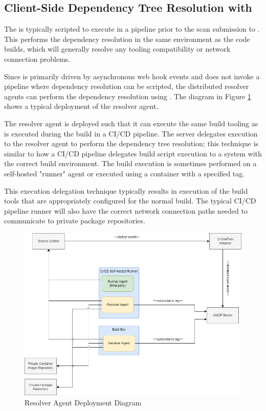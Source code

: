 \subsection{Client-Side Dependency Tree Resolution with \scaresolver}

The \scaresolver is typically scripted to execute in
a pipeline prior to the scan submission to \cxone.  This performs the dependency resolution
in the same environment as the code builds, which will generally resolve any tooling compatibility or network connection
problems.  

Since \cxoneflow is primarily driven by asynchronous web hook events and does not invoke a pipeline
where dependency resolution can be scripted, the distributed resolver agents can perform the dependency resolution using
\scaresolver. The diagram in Figure \ref{fig:resolver-agent-diagram} shows a typical deployment of the resolver agent.  


The resolver agent is deployed such that it can execute the same build tooling as is executed during the build
in a CI/CD pipeline. The \cxoneflow server delegates \scaresolver execution to the resolver agent to perform the dependency tree
resolution; this technique is similar to how a CI/CD pipeline delegates build script execution to a system with the correct
build environment.  The build execution is sometimes performed on a self-hosted "runner" agent or executed using a container with a specified tag. 

This execution delegation technique typically results in execution of the build tools that are appropriately
configured for the normal build.  The typical CI/CD pipeline runner will also have the correct network connection paths
needed to communicate to private package repositories.


\begin{figure}[ht]
  \includegraphics[width=\textwidth]{graphics/cxoneflow-diagrams-Resolver Agent Diagram.png}
  \caption{Resolver Agent Deployment Diagram}
  \label{fig:resolver-agent-diagram}
\end{figure}


